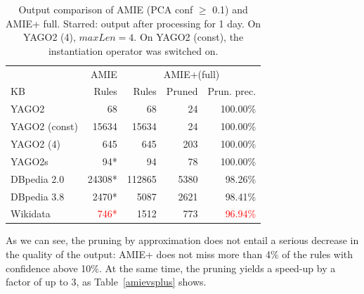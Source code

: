 \begin{center}
\begin{savenotes}
\begin{table}[t]
\footnotesize
\centering
\begin{tabular}{|l| r |r r r|}
\hline
			& AMIE			& \multicolumn{3}{c|}{AMIE+(full)} 	\\ \cline{2-5}
KB			& Rules 		& Rules		&Pruned	& Prun. prec. 	   \\ \hline
  YAGO2  		& 68			& 68 		&24 	&100.00\%      	    \\ 
  YAGO2 (const)  	& 15634			& 15634		&24	&100.00\% 	    \\  
  YAGO2 (4)  		& 645			& 645		&203 	&100.00\%   	    \\ 
  YAGO2s  		& 94*			& 94	 	&78 	&100.00\%		    \\
  DBpedia 2.0 		& 24308*		& 112865	&5380 	&98.26\%      	    		\\ 
  DBpedia 3.8 		& 2470*			& 5087       	&2621 	&98.41\%	    		\\
  Wikidata  		& \textcolor{red}{746*}	& 1512		&773 	&\textcolor{red}{96.94\%}      	    \\  \hline
\end{tabular}
\caption{Output comparison of AMIE (PCA conf $\ge$ 0.1) and AMIE+ full. Starred: output after processing for 1 day. On YAGO2 (4), $maxLen=4$. On YAGO2 (const), the instantiation operator was switched on.}
\label{outputComparison}
\end{table}
\end{savenotes}
\end{center}


As we can see, the pruning by approximation does not entail a serious decrease in the quality of the output:  
AMIE+ does not miss more than 4\% of the rules with confidence above 10\%.  
At the same time, the pruning yields a speed-up by a factor of up to 3, as Table~\ref{amievsplus} shows.

